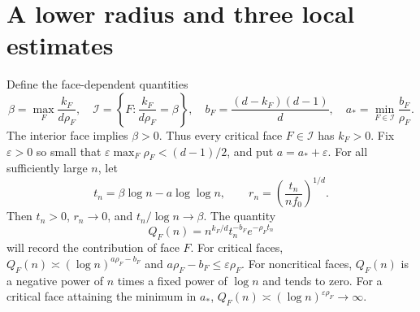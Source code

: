 \documentclass[11pt]{article}
\theoremstyle{remark}
\begin{document}
\section{A lower radius and three local estimates}
Define the face-dependent quantities
\begin{equation}\label{eq:critical}
 \beta=\max_F\frac{k_F}{d\rho_F},\quad
 \mathcal I=\left\{F:\frac{k_F}{d\rho_F}=\beta\right\},\quad
 b_F=\frac{(d-k_F)(d-1)}d,\quad
 a_* =\min_{F\in\mathcal I}\frac{b_F}{\rho_F}.
\end{equation}
The interior face implies $\beta>0$. Thus every critical face
$F\in\mathcal I$ has $k_F>0$. Fix $\varepsilon>0$ so small that
$\varepsilon\max_F\rho_F<(d-1)/2$, and put $a=a_*+\varepsilon$.
For all sufficiently large $n$, let
\begin{equation}\label{eq:lower}
 t_n=\beta\log n-a\log\log n,\qquad
 r_n=\left(\frac{t_n}{nf_0}\right)^{1/d}.
\end{equation}
Then $t_n>0$, $r_n\to0$, and $t_n/\log n\to\beta$.
The quantity
\begin{equation}\label{eq:Q}
 Q_F(n)=n^{k_F/d}t_n^{-b_F}e^{-\rho_Ft_n}
\end{equation}
will record the contribution of face $F$. For critical faces,
$Q_F(n)\asymp(\log n)^{a\rho_F-b_F}$ and
$a\rho_F-b_F\leq\varepsilon\rho_F$. For noncritical faces, $Q_F(n)$ is a
negative power of $n$ times a fixed power of $\log n$ and tends to zero.
For a critical face attaining the minimum in $a_*$,
$Q_F(n)\asymp(\log n)^{\varepsilon\rho_F}\to\infty$.
\end{document}
